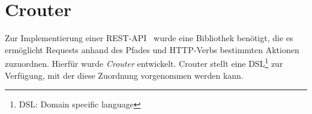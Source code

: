 \section{Crouter}
\label{sec:b_crouter}

Zur Implementierung einer REST-API~\cite{rest} wurde eine Bibliothek benötigt,
die es ermöglicht Requests anhand des Pfades und HTTP-Verbs bestimmten Aktionen
zuzuordnen.  Hierfür wurde \emph{Crouter} entwickelt.  Crouter stellt eine
DSL\footnote{DSL: Domain specific language} zur Verfügung, mit der diese
Zuordnung vorgenommen werden kann.




